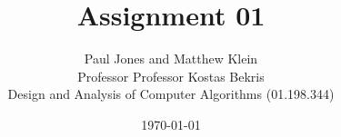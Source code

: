 \documentclass[11pt]{article}
\title{Assignment 01}
\author{Paul Jones and Matthew Klein \\
		Professor Professor Kostas Bekris\\
		Design and Analysis of Computer Algorithms (01.198.344)}
\date{\today}
\begin{document}
\maketitle

\pagebreak
\end{document}
